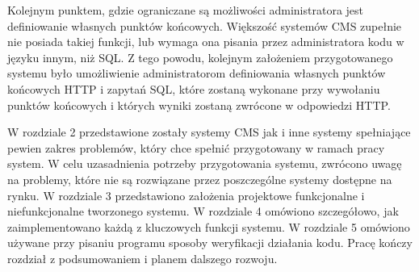 Kolejnym punktem, gdzie ograniczane są możliwości administratora jest
definiowanie własnych punktów końcowych. Większość systemów CMS zupełnie nie
posiada takiej funkcji, lub wymaga ona pisania przez administratora kodu w
języku innym, niż SQL. Z tego powodu, kolejnym założeniem przygotowanego systemu
było umożliwienie administratorom definiowania własnych punktów końcowych HTTP i
zapytań SQL, które zostaną wykonane przy wywołaniu punktów końcowych i których
wyniki zostaną zwrócone w odpowiedzi HTTP.

\vspace{2cm}

W rozdziale 2 przedstawione zostały systemy CMS jak i inne systemy spełniające
pewien zakres problemów, który chce spełnić przygotowany w ramach pracy system.
W celu uzasadnienia potrzeby przygotowania systemu, zwrócono uwagę na problemy,
które nie są rozwiązane przez poszczególne systemy dostępne na rynku. W
rozdziale 3 przedstawiono założenia projektowe funkcjonalne i niefunkcjonalne
tworzonego systemu. W rozdziale 4 omówiono szczegółowo, jak zaimplementowano
każdą z kluczowych funkcji systemu. W rozdziale 5 omówiono używane przy pisaniu
programu sposoby weryfikacji działania kodu. Pracę kończy rozdział z
podsumowaniem i planem dalszego rozwoju.
